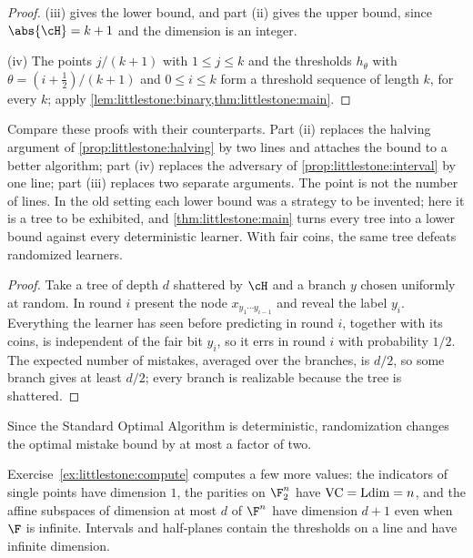 \begin{refsection}
\begin{proof}
(iii)  gives the lower bound, and part (ii) gives the upper bound, since $\abs{\cH}=k+1$ and the dimension is an integer.

(iv) The points $j/(k+1)$ with $1\le j\le k$ and the thresholds $h_\theta$ with $\theta=(i+\frac12)/(k+1)$ and $0\le i\le k$ form a threshold sequence of length $k$, for every $k$; apply \cref{lem:littlestone:binary,thm:littlestone:main}.
\end{proof}

Compare these proofs with their counterparts. Part (ii) replaces the halving argument of \cref{prop:littlestone:halving} by two lines and attaches the bound to a better algorithm; part (iv) replaces the adversary of \cref{prop:littlestone:interval} by one line; part (iii) replaces two separate arguments. The point is not the number of lines. In the old setting each lower bound was a strategy to be invented; here it is a tree to be exhibited, and \cref{thm:littlestone:main} turns every tree into a lower bound against every deterministic learner. With fair coins, the same tree defeats randomized learners.


\begin{proof}
Take a tree of depth $d$ shattered by $\cH$ and a branch $y$ chosen uniformly at random. In round $i$ present the node $x_{y_1\cdots y_{i-1}}$ and reveal the label $y_i$. Everything the learner has seen before predicting in round $i$, together with its coins, is independent of the fair bit $y_i$, so it errs in round $i$ with probability $1/2$. The expected number of mistakes, averaged over the branches, is $d/2$, so some branch gives at least $d/2$; every branch is realizable because the tree is shattered.
\end{proof}

Since the Standard Optimal Algorithm is deterministic, randomization changes the optimal mistake bound by at most a factor of two.

Exercise~\ref{ex:littlestone:compute} computes a few more values: the indicators of single points have dimension $1$, the parities on $\F_2^n$ have $\operatorname{VC}=\operatorname{Ldim}=n$, and the affine subspaces of dimension at most $d$ of $\F^n$ have dimension $d+1$ even when $\F$ is infinite. Intervals and half-planes contain the thresholds on a line and have infinite dimension.


\end{refsection}
